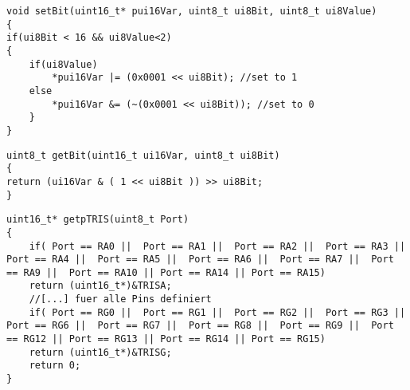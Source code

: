 \begin{lstlisting}[frame=htrbl, caption={setBit() Funktion}, label={lst:setBit}]
void setBit(uint16_t* pui16Var, uint8_t ui8Bit, uint8_t ui8Value)
{
if(ui8Bit < 16 && ui8Value<2)
{
	if(ui8Value)
		*pui16Var |= (0x0001 << ui8Bit); //set to 1
	else
		*pui16Var &= (~(0x0001 << ui8Bit)); //set to 0
	}
}
\end{lstlisting}

\begin{lstlisting}[frame=htrbl, caption={getBit() Funktion}, label={lst:getBit}]
uint8_t getBit(uint16_t ui16Var, uint8_t ui8Bit)
{
return (ui16Var & ( 1 << ui8Bit )) >> ui8Bit;
}
\end{lstlisting}

\begin{lstlisting}[frame=htrbl, caption={getpTRIS() Funktion}, label={lst:getpTRIS}]
uint16_t* getpTRIS(uint8_t Port)
{
	if( Port == RA0 ||  Port == RA1 ||  Port == RA2 ||  Port == RA3 ||  Port == RA4 ||  Port == RA5 ||  Port == RA6 ||  Port == RA7 ||  Port == RA9 ||  Port == RA10 || Port == RA14 || Port == RA15)
	return (uint16_t*)&TRISA;
	//[...] fuer alle Pins definiert
	if( Port == RG0 ||  Port == RG1 ||  Port == RG2 ||  Port == RG3 ||  Port == RG6 ||  Port == RG7 ||  Port == RG8 ||  Port == RG9 ||  Port == RG12 || Port == RG13 || Port == RG14 || Port == RG15)
	return (uint16_t*)&TRISG;
	return 0;
}
\end{lstlisting}
